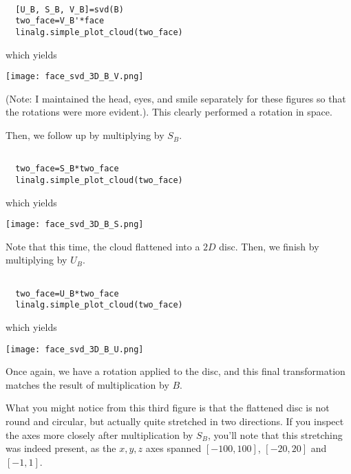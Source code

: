 \documentclass{ximera}
\begin{document}
\begin{problem}
\begin{verbatim}

  [U_B, S_B, V_B]=svd(B)
  two_face=V_B'*face
  linalg.simple_plot_cloud(two_face)

\end{verbatim}

which yields

\begin{center}
  \texttt{[image: face\_svd\_3D\_B\_V.png]}
\end{center}

(Note: I maintained the head, eyes, and smile separately for these figures so that the rotations were more evident.). This clearly performed a rotation in space.

Then, we follow up by multiplying by $S_B$.

\begin{verbatim}

  two_face=S_B*two_face
  linalg.simple_plot_cloud(two_face)

\end{verbatim}

which yields

\begin{center}
  \texttt{[image: face\_svd\_3D\_B\_S.png]}
\end{center}

Note that this time, the cloud flattened into a $2D$ disc. Then, we finish by multiplying by $U_B$.

\begin{verbatim}

  two_face=U_B*two_face
  linalg.simple_plot_cloud(two_face)

\end{verbatim}

which yields

\begin{center}
  \texttt{[image: face\_svd\_3D\_B\_U.png]}
\end{center}

Once again, we have a rotation applied to the disc, and this final transformation matches the result of multiplication by $B$.

What you might notice from this third figure is that the flattened disc is not round and circular, but actually quite stretched in two directions. If you inspect the axes more closely after multiplication by $S_B$, you'll note that this stretching was indeed present, as the $x,y,z$ axes spanned $[-100,100]$, $[-20,20]$ and $[-1,1]$.


\end{problem}
\end{document}
